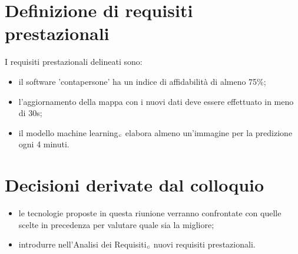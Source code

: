 \section{Definizione di requisiti prestazionali}
I requisiti prestazionali delineati sono:
\begin{itemize}
	\item il software 'contapersone' ha un indice di affidabilità di almeno 75\%;
	\item l'aggiornamento della mappa con i nuovi dati deve essere effettuato in meno di 30s;
	\item il modello machine learning$_{\scaleto{G}{3pt}}$ elabora almeno un'immagine per la predizione ogni 4 minuti.
\end{itemize}
\section{Decisioni derivate dal colloquio}
\begin{itemize}
	\item le tecnologie proposte in questa riunione verranno confrontate con quelle scelte in precedenza per valutare quale sia la migliore;
	\item introdurre nell'Analisi dei Requisiti$_{\scaleto{G}{3pt}}$ nuovi requisiti prestazionali.
\end{itemize}

